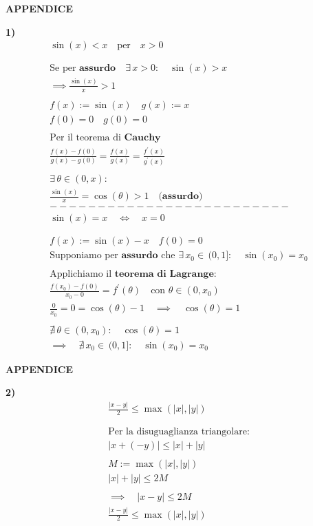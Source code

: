 \documentclass[11pt,reqno]{amsart}
\begin{document}
\newpage
\centerline{\bf APPENDICE }
\bigskip

{\bf 1)}
\begin{gather*}
  \sin(x) < x \quad \text{per} \quad x>0\\\\\\
  \text{Se per } \textbf{assurdo} \quad \exists \, x>0: \quad \sin(x) > x\\
  \implies \frac{\sin(x)}{x} > 1\\\\
  f(x) := \sin(x) \quad g(x) := x\\
  f(0) = 0 \quad g(0) = 0\\\\
  \text{Per il teorema di } \textbf{Cauchy}\\
  \frac{f(x) - f(0)}{g(x) - g(0)} = \frac{f(x)}{g(x)} = \frac{f^{'}(x)}{g^{'}(x)}\\\\
  \exists \, \theta \in (0,x):\\
  \frac{\sin(x)}{x} = \cos(\theta) > 1 \quad \text{(} \textbf{assurdo} \text{)}\\
  -------------------------\\
  \sin(x) = x \quad \iff \quad x = 0\\\\\\
  f(x) := \sin(x) - x \quad f(0) = 0\\
  \text{Supponiamo per } \textbf{assurdo} \text{ che } \exists \, x_0 \in \, (0,1]: \quad \sin(x_0) = x_0\\\\
  \text{Applichiamo il } \textbf{teorema di Lagrange}:\\
  \frac{f(x_0) - f(0)}{x_0 - 0} = f^{'}(\theta) \quad \text{con } \theta \in (0,x_0)\\
  \frac{0}{x_0} = 0 = \cos(\theta) - 1 \quad \implies \quad \cos(\theta) = 1\\\\
  \nexists \, \theta \in (0,x_0): \quad \cos(\theta) = 1\\
  \implies \quad \nexists \, x_0 \in \, (0,1]: \quad \sin(x_0) = x_0
\end{gather*}

\newpage
\centerline{\bf APPENDICE }
\bigskip

{\bf 2)}
\begin{gather*}
  \frac{|x-y|}{2} \leq \max{(|x|,|y|)}\\\\\\
  \text{Per la disuguaglianza triangolare:}\\
  |x+(-y)| \leq |x| + |y|\\\\
  M := \max{(|x|,|y|)}\\
  |x| + |y| \leq 2M\\\\
  \implies \quad |x-y| \leq 2M\\
  \frac{|x-y|}{2} \leq \max{(|x|,|y|)}\\
\end{gather*}
\end{document}
